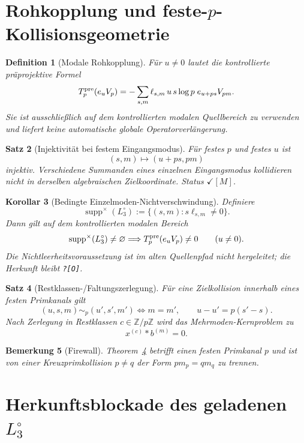 \documentclass[11pt,a4paper]{amsart}
\newtheorem{theorem}{Satz}[section]
\newtheorem{corollary}[theorem]{Korollar}
\newtheorem{definition}[theorem]{Definition}
\newtheorem{remark}[theorem]{Bemerkung}
\newcommand{\stM}{\ensuremath{\checkmark[M]}}
\newcommand{\Open}{\texttt{?[O]}}
\begin{document}
\section{Rohkopplung und feste-$p$-Kollisionsgeometrie}

\begin{definition}[Modale Rohkopplung]\label{def:modal-raw}
Für $u\neq0$ lautet die kontrollierte präprojektive Formel
\[
T_p^{\rm pre}(e_uV_p)
=-\sum_{s,m}\ell_{s,m}\,u\,s\log p\;e_{u+ps}V_{pm}.
\]
Sie ist ausschließlich auf dem kontrollierten modalen Quellbereich zu
verwenden und liefert keine automatische globale Operatorverlängerung.
\end{definition}

\begin{theorem}[Injektivität bei festem Eingangsmodus]
Für festes $p$ und festes $u$ ist
\[
(s,m)\longmapsto(u+ps,pm)
\]
injektiv. Verschiedene Summanden eines einzelnen Eingangsmodus kollidieren
nicht in derselben algebraischen Zielkoordinate. Status \stM.
\end{theorem}

\begin{corollary}[Bedingte Einzelmoden-Nichtverschwindung]
Definiere
\[
\operatorname{supp}^{\times}(L_3^\circ)
:=\{(s,m):s\ell_{s,m}\neq0\}.
\]
Dann gilt auf dem kontrollierten modalen Bereich
\[
\operatorname{supp}^{\times}(L_3^\circ)\neq\varnothing
\Longrightarrow T_p^{\rm pre}(e_uV_p)\neq0\qquad(u\neq0).
\]
Die Nichtleerheitsvoraussetzung ist im alten Quellenpfad nicht hergeleitet;
die Herkunft bleibt \Open.
\end{corollary}

\begin{theorem}[Restklassen-/Faltungszerlegung]\label{thm:convolution}
Für eine Zielkollision innerhalb eines festen Primkanals gilt
\[
(u,s,m)\sim_p(u',s',m')
\Longleftrightarrow
m=m',\qquad u-u'=p(s'-s).
\]
Nach Zerlegung in Restklassen $c\in\mathbb Z/p\mathbb Z$ wird das
Mehrmoden-Kernproblem zu
\[
x^{(c)}*b^{(m)}=0.
\]
\end{theorem}

\begin{remark}[Firewall]
Theorem~\ref{thm:convolution} betrifft einen festen Primkanal $p$ und ist
von einer Kreuzprimkollision $p\neq q$ der Form $pm_p=qm_q$ zu trennen.
\end{remark}

\section{Herkunftsblockade des geladenen $L_3^\circ$}
\end{document}

